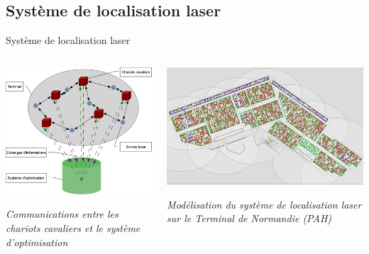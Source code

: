 \documentclass{beamer}
\begin{document}
\subsection{Système de localisation laser}
\begin{frame}{Système de localisation laser}
  \begin{columns}
    \begin{column}[l]{4.0cm}	
	\includegraphics[height=.50\textheight]{fig/communications.png}
	\begin{center}
	   \tiny \textit{Communications entre les chariots cavaliers et le système d'optimisation}
	  \end{center}
    \end{column}
    \begin{column}[r]{6.5cm}
	\begin{flushright}
	  \includegraphics[height=.50\textheight]{fig/captureBornesLaser.png}
	  \begin{center}
	   \tiny \textit{ Modélisation du système de localisation laser sur le Terminal de Normandie (PAH)}
	  \end{center}
	\end{flushright}
    \end{column}
 \end{columns}	
\end{frame}
\end{document}
